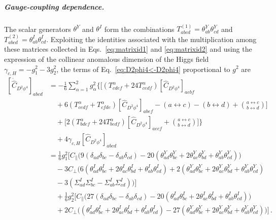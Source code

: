 \subparagraph{Gauge-coupling dependence.}
The scalar generators $\theta^Y$ and $\theta^I$ form the combinations $T^{(1)}_{abcd}=\theta^Y_{ab}\theta^Y_{cd}$ and $T^{(2)}_{abcd}=\theta^I_{ab}\theta^I_{cd}$.
Exploiting the identities associated with the multiplication among these matrices collected in Eqs.~\eqref{eq:matrixid1} and \eqref{eq:matrixid2} and using the expression of the collinear anomalous dimension of the Higgs field $\gamma_{c,H} = -g_1^2-3g_2^2$, the terms of Eq.~\eqref{eq:D2phi4<-D2phi4} proportional to $g^2$ are
\begin{align}
    \left[\dot{\widehat C}_{D^2\phi^4}\right]_{abcd}
    &=
    -\frac{1}{6}\sum_{\alpha=1}^{2}g_\alpha^2 
    \bigg\{
    \bigg[
    \left(T^\alpha_{cdef}+24T^\alpha_{cedf}
    \right)\left[\widehat C_{D^2\phi^4}\right]_{aebf} \nonumber \\
    &\quad+ 6\left(T^\alpha_{cedf}+T^\alpha_{cfde}\right)\left[\widehat C_{D^2\phi^4}\right]_{abef} - (a\leftrightarrow c) - (b\leftrightarrow d) + 
    \binom{a\leftrightarrow c}{b\leftrightarrow d}
    \bigg] \nonumber \\
    &\quad+ \bigg[
    2\left(T^\alpha_{bdef}+24T^\alpha_{bedf}
    \right)\left[\widehat C_{D^2\phi^4}\right]_{aecf} + 
    \binom{a\leftrightarrow c}{b\leftrightarrow d}
    \bigg]
    \bigg\} \nonumber \\
    &\quad+4 \gamma_{c,H}\left[\widehat C_{D^2\phi^4}\right]_{abcd}\nonumber \\
    &=
    \frac{1}{6}g_1^2 \Big[
    C_\parallel \Big(
    9(\delta_{ad}\delta_{bc}-\delta_{ab}\delta_{cd})-20(\theta^Y_{ad}\theta^Y_{bc}+2\theta^Y_{ac}\theta^Y_{bd}+\theta^Y_{ab}\theta^Y_{cd} )
    \Big)  \\
    &\quad-3 C_\perp \Big(
    6(\theta^I_{ad}\theta^I_{bc}+2\theta^I_{ac}\theta^I_{bd}+\theta^I_{ab}\theta^I_{cd} )
    +2 (\theta^Y_{ad}\theta^Y_{bc}+2\theta^Y_{ac}\theta^Y_{bd}+\theta^Y_{ab}\theta^Y_{cd} )\nonumber \\
    &\quad-3(\Sigma^I_{ad}\Sigma^I_{bc}-\Sigma^I_{ab}\Sigma^I_{cd})
    \Big)
    \Big]\nonumber \\
    &\quad +\frac{1}{6}g_2^2 \Big[
    C_\parallel \Big(
    27(\delta_{ad}\delta_{bc}-\delta_{ab}\delta_{cd})
    -20 (\theta^I_{ad}\theta^I_{bc}+2\theta^I_{ac}\theta^I_{bd}+\theta^I_{ab}\theta^I_{cd} )
    \Big) \nonumber \\
    &\quad+2 C_\perp \Big(
    (\theta^I_{ad}\theta^I_{bc}+2\theta^I_{ac}\theta^I_{bd}+\theta^I_{ab}\theta^I_{cd} )
    -27 (\theta^Y_{ad}\theta^Y_{bc}+2\theta^Y_{ac}\theta^Y_{bd}+\theta^Y_{ab}\theta^Y_{cd} )
    \Big)
    \Big]\nonumber\,.
\end{align}
